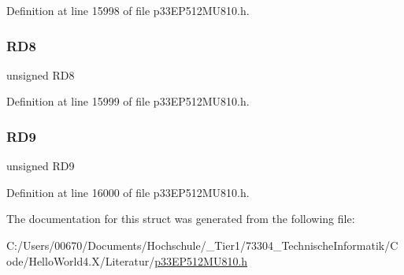 Definition at line 15998 of file p33\+E\+P512\+M\+U810.\+h.

\mbox{\label{structtag_p_o_r_t_d_b_i_t_s_a775089b0ae122f120b42eeb7814e820f}} 
\subsubsection{\texorpdfstring{R\+D8}{RD8}}
{\footnotesize\ttfamily unsigned R\+D8}



Definition at line 15999 of file p33\+E\+P512\+M\+U810.\+h.

\mbox{\label{structtag_p_o_r_t_d_b_i_t_s_a4183e1dad032d6abff701bf44855a53e}} 
\subsubsection{\texorpdfstring{R\+D9}{RD9}}
{\footnotesize\ttfamily unsigned R\+D9}



Definition at line 16000 of file p33\+E\+P512\+M\+U810.\+h.



The documentation for this struct was generated from the following file\+:\begin{DoxyCompactItemize}
\item 
C\+:/\+Users/00670/\+Documents/\+Hochschule/\+\_\+\+Tier1/73304\+\_\+\+Technische\+Informatik/\+Code/\+Hello\+World4.\+X/\+Literatur/\hyperlink{p33_e_p512_m_u810_8h}{p33\+E\+P512\+M\+U810.\+h}\end{DoxyCompactItemize}
